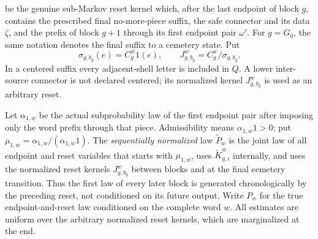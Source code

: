 \documentclass[12pt,reqno]{amsart}
\theoremstyle{plain}
\theoremstyle{definition}
\theoremstyle{remark}
\numberwithin{equation}{section}
\begin{document}
be the genuine sub-Markov reset kernel which, after the last endpoint
of block \(g\), contains the prescribed final no-more-piece suffix, the
safe connector and its data \(\zeta\), and the prefix of block \(g+1\)
through its first endpoint pair \(\omega'\).  For \(g=G_0\), the same
notation denotes the final suffix to a cemetery state.  Put
\begin{equation}
 \sigma_{g,b_g}(e)=C_g^w1(e),\qquad
 J_{g,b_g}^w=C_g^w/\sigma_{g,b_g}.                          \label{eq:tu-47d-doubleprime}
\end{equation}
In a centered suffix every adjacent-shell letter is included in \(Q\).
A lower inter-source connector is not declared centered; its normalized
kernel \(J_{g,b_g}^w\) is used as an arbitrary reset.

Let \(\alpha_{1,w}\) be the actual subprobability law of the first endpoint
pair after imposing only the word prefix through that piece.  Admissibility
means \(\alpha_{1,w}1>0\); put
\(\mu_{1,w}=\alpha_{1,w}/(\alpha_{1,w}1)\).  The
\emph{sequentially normalized} law \(\widetilde P_w\) is the
joint law of all endpoint and reset variables that starts with
\(\mu_{1,w}\), uses \(\widetilde K_{g,i}^w\) internally, and uses the
normalized reset kernels \(J_{g,b_g}^w\) between blocks and at the final
cemetery transition.  Thus the first law of every later block is
generated chronologically by the preceding reset, not conditioned on
its future output.  Write \(P_w\) for the true endpoint-and-reset law
conditioned on the complete word \(w\).  All estimates are uniform over
the arbitrary normalized reset kernels, which are marginalized at the
end.
\end{document}

